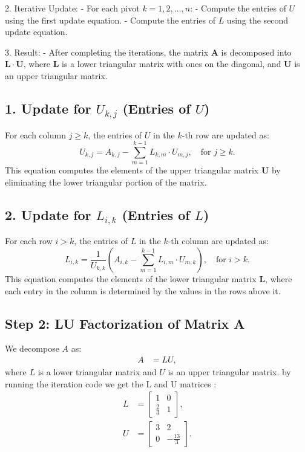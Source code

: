 \documentclass[journal]{IEEEtran}
\begin{document}
	2. Iterative Update:
	- For each pivot $ k = 1, 2, \ldots, n $:
	- Compute the entries of $ U $ using the first update equation.
	- Compute the entries of $ L $ using the second update equation.
	
	3. Result:
	- After completing the iterations, the matrix $ \mathbf{A} $ is decomposed into $ \mathbf{L} \cdot \mathbf{U} $, where $ \mathbf{L} $ is a lower triangular matrix with ones on the diagonal, and $ \mathbf{U} $ is an upper triangular matrix.
	
	
	
	\subsection*{1. Update for $ U_{k,j} $ (Entries of $ U $)}
	
	For each column $ j \geq k $, the entries of $ U $ in the $ k $-th row are updated as:
	\[
	U_{k,j} = A_{k,j} - \sum_{m=1}^{k-1} L_{k,m} \cdot U_{m,j}, \quad \text{for } j \geq k.
	\]
	This equation computes the elements of the upper triangular matrix $ \mathbf{U} $ by eliminating the lower triangular portion of the matrix.
	
	\subsection*{2. Update for $ L_{i,k} $ (Entries of $ L $)}
	
	For each row $ i > k $, the entries of $ L $ in the $ k $-th column are updated as:
	\[
	L_{i,k} = \frac{1}{U_{k,k}} \left( A_{i,k} - \sum_{m=1}^{k-1} L_{i,m} \cdot U_{m,k} \right), \quad \text{for } i > k.
	\]
	This equation computes the elements of the lower triangular matrix $ \mathbf{L} $, where each entry in the column is determined by the values in the rows above it.\\
	\subsection*{Step 2: LU Factorization of Matrix A}
	We decompose $A$ as:
	\begin{align}
		A &= LU,
	\end{align}
	where $L$ is a lower triangular matrix and $U$ is an upper triangular matrix.
	by running the iteration code we get the L and U matrices :
	\begin{align}
		L &= \begin{bmatrix} 1 & 0 \\ \frac{2}{3} & 1 \end{bmatrix}, \\
		U &= \begin{bmatrix} 3 & 2 \\ 0 & -\frac{13}{3} \end{bmatrix}.
	\end{align}
	
\end{document}
